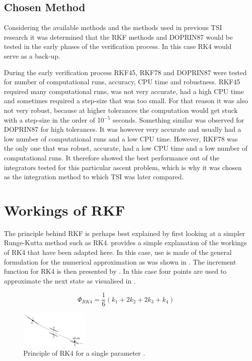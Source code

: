 \subsection{Chosen Method}
\label{subsec:chosenMethod}
Considering the available methods and the methods used in previous \ac{TSI} research it was determined that the \ac{RKF} methods and \ac{DOPRIN87} would be tested in the early phases of the verification process. In this case \ac{RK4} would serve as a back-up. 

During the early verification process \ac{RKF45}, \ac{RKF78} and \ac{DOPRIN87} were tested for number of computational runs, accuracy, CPU time and robustness. \ac{RKF45} required many computational runs, was not very accurate, had a high CPU time and sometimes required a step-size that was too small. For that reason it was also not very robust, because at higher tolerances the computation would get stuck with a step-size in the order of 10$^{-5}$ seconds. Something similar was observed for \ac{DOPRIN87} for high tolerances. It was however very accurate and usually had a low number of computational runs and a low CPU time. However, \ac{RKF78} was the only one that was robust, accurate, had a low CPU time and a low number of computational runs. It therefore showed the best performance out of the integrators tested for this particular ascent problem, which is why it was chosen as the integration method to which \ac{TSI} was later compared.


\section{Workings of \ac{RKF}}
\label{sec:rkf}
The principle behind \ac{RKF} is perhaps best explained by first looking at a simpler Runge-Kutta method such as \ac{RK4}. \cite{noomen2013int} provides a simple explanation of the workings of \ac{RK4} that have been adapted here. In this case, use is made of the general formulation for the numerical approximation as was shown in . The increment function for \ac{RK4} is then presented by . In this case four points are used to approximate the next state as visualised in . 

\begin{equation} \label{eq:rk4_increment}
\Phi_{RK4}=\dfrac{1}{6}\left(k_{1}+2k_{2}+2k_{3}+k_{4}\right)
\end{equation}


\begin{figure}[H]
\centering
\includegraphics[width=0.3\textwidth]{figures/integrators/rk4_noomen2013int.jpg}
\caption{Principle of \ac{RK4} for a single parameter \cite{noomen2013int}.}
\label{fig:rk4_noomen2013int}
\end{figure}

